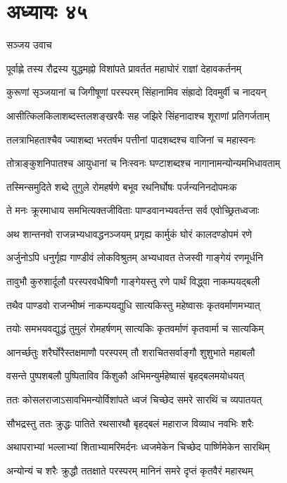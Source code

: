 \chapter{अध्यायः ४५}
\twolineshloka
{सञ्जय उवाच}
{}


\twolineshloka
{पूर्वाह्णे तस्य रौद्रस्य युद्धमह्नो विशांपते}
{प्रावर्तत महाघोरं राज्ञां देहावकर्तनम्}


\twolineshloka
{कुरूणां सृञ्जयानां च जिगीषूणां परस्परम्}
{सिंहानामिव संह्रादो दिवमुर्वी च नादयन्}


\twolineshloka
{आसीत्किलकिलाशब्दस्तलशङ्खरवैः सह}
{जझिरे सिंहनादाश्च शूराणां प्रतिगर्जताम्}


\twolineshloka
{तलत्राभिहताश्चैव ज्याशब्दा भरतर्षभ}
{पत्तीनां पादशब्दश्च वाजिनां च महास्वनः}


\twolineshloka
{तोत्राङ्कुशनिपातश्च आयुधानां च निःस्वनः}
{घण्टाशब्दश्च नागानामन्योन्यमभिधावताम्}


\twolineshloka
{तस्मिन्समुदिते शब्दे तुगुले रोमहर्षणे}
{बभूव रथनिर्घोषः पर्जन्यनिनदोपमःक}


\twolineshloka
{ते मनः क्रूरमाधाय समभित्यक्तजीविताः}
{पाण्डवानभ्यवर्तन्त सर्व एवोच्छ्रितध्वजाः}


\twolineshloka
{अथ शान्तनवो राजन्नभ्यधावद्धनञ्जयम्}
{प्रगृह्य कार्मुकं घोरं कालदण्डोपमं रणे}


\twolineshloka
{अर्जुनोऽपि धनुर्गृह्य गाण्डीवं लोकविश्रुतम्}
{अभ्यधावत तेजस्वी गाङ्गेयं रणमूर्धनि}


\twolineshloka
{तावुभौ कुरुशार्दूलौ परस्परवधैषिणौ}
{गाङ्गेयस्तु रणे पार्थं विद्ध्वा नाकम्पयद्बली}


\twolineshloka
{तथैव पाण्डवो राजन्भीष्मं नाकम्पयद्युधि}
{सात्यकिस्तु महेष्वासः कृतवर्माणमभ्यात्}


\twolineshloka
{तयोः समभयवद्युद्धं तुमुलं रोमहर्षणम्}
{सात्यकिः कृतवर्माणं कृतवार्मा च सात्यकिम्}


\twolineshloka
{आनर्च्छतुः शरैर्घोरैस्तक्षमाणौ परस्परम्}
{तौ शराचितसर्वाङ्गौ शुशुभाते महाबलौ}


\twolineshloka
{वसन्ते पुष्पशबलौ पुष्पिताविव किंशुकौ}
{अभिमन्युर्महेष्वासं बृहद्बलमयोधयत्}


\twolineshloka
{ततः कोसलराजाऽसावभिमन्योर्विशांपते}
{ध्वजं चिच्छेद समरे सारथिं च व्यपातयत्}


\twolineshloka
{सौभद्रस्तु ततः क्रुद्धः पातिते रथसारथौ}
{बृहद्बलं महाराज विव्याध नवभिः शरैः}


\twolineshloka
{अथापराभ्यां भल्लाभ्यां शिताभ्यामरिमर्दनः}
{ध्वजमेकेन चिच्छेद पार्ष्णिमेकेन सारथिम्}


\twolineshloka
{अन्योन्यं च शरैः क्रुद्धौ ततक्षाते परस्परम्}
{मानिनं समरे दृप्तं कृतवैरं महारथम्}


